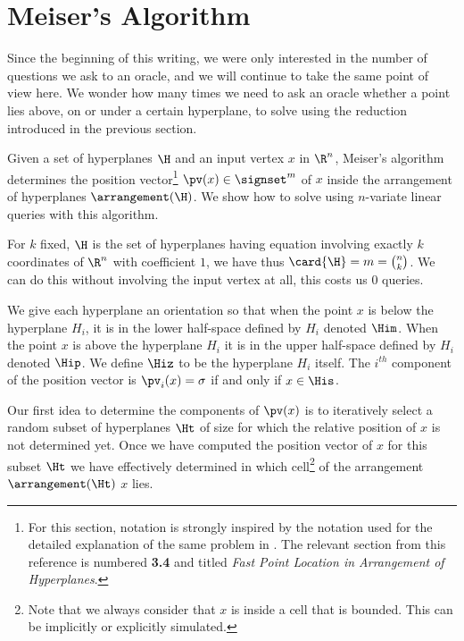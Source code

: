 \section{Meiser's Algorithm}

Since the beginning of this writing, we were only interested in the number of
questions we ask to an oracle, and we will continue to take the same point of
view here. We wonder how many times we need to ask an oracle whether a point
lies above, on or under a certain hyperplane, to solve \kSUM using the
reduction introduced in the previous section.

Given a set of hyperplanes \(\H\) and an input vertex \(x\) in \(\R^n\),
Meiser's algorithm \cite{meiser:1993} determines the position vector\footnote{
For this section, notation is strongly inspired by the notation
used for the detailed explanation of the same problem in \citet*{burgisser:1997}.
The relevant section from this reference is numbered \textbf{3.4} and titled
\emph{Fast Point Location in Arrangement of Hyperplanes}.
}
$\pv(x) \in
\signset^{m}$ of $x$ inside the
arrangement of hyperplanes $\arrangement(\H)$.
We show how to solve \kSUM using  $n$-variate
linear queries with this algorithm.

For \(k\) fixed,
\(\H\) is the set of hyperplanes having equation involving exactly $k$
coordinates of $\R^n$ with coefficient $1$, we have thus $\card{\H} = m =
\binom{n}{k}$. We can do this without involving the input vertex at all, this
costs us $0$ queries.

We give each hyperplane an orientation so that when the point $x$ is below
the
hyperplane $H_i$, it is in the lower half-space defined by $H_i$ denoted
$\Him$. When the point $x$ is above the hyperplane $H_i$ it is in the upper
half-space defined by $H_i$ denoted $\Hip$. We define $\Hiz$ to be the
hyperplane $H_i$ itself. The $i^{th}$ component of the position vector is
$\pv_i(x) = \sigma$ if and only if $x \in \His$.

Our first idea to determine the components of $\pv(x)$ is to iteratively
select a random subset of hyperplanes \(\Ht\) of size 
for which the relative position of $x$ is not
determined yet. Once we have
computed the position vector of \(x\) for this subset \(\Ht\)
we have effectively determined in
which cell\footnote{Note that we always consider that \(x\) is inside a cell that is bounded.
This can be implicitly or explicitly simulated.}
of the arrangement $\arrangement(\Ht)$ $x$ lies.

